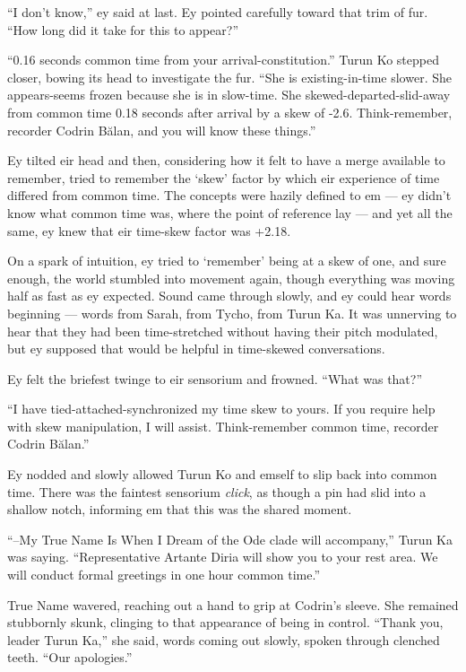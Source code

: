 ``I don't know,'' ey said at last. Ey pointed carefully toward that trim of fur. ``How long did it take for this to appear?''

``0.16 seconds common time from your arrival-constitution.'' Turun Ko stepped closer, bowing its head to investigate the fur. ``She is existing-in-time slower. She appears-seems frozen because she is in slow-time. She skewed-departed-slid-away from common time 0.18 seconds after arrival by a skew of -2.6. Think-remember, recorder Codrin Bălan, and you will know these things.''

Ey tilted eir head and then, considering how it felt to have a merge available to remember, tried to remember the `skew' factor by which eir experience of time differed from common time. The concepts were hazily defined to em — ey didn't know what common time was, where the point of reference lay — and yet all the same, ey knew that eir time-skew factor was +2.18.

On a spark of intuition, ey tried to `remember' being at a skew of one, and sure enough, the world stumbled into movement again, though everything was moving half as fast as ey expected. Sound came through slowly, and ey could hear words beginning — words from Sarah, from Tycho, from Turun Ka. It was unnerving to hear that they had been time-stretched without having their pitch modulated, but ey supposed that would be helpful in time-skewed conversations.

Ey felt the briefest twinge to eir sensorium and frowned. ``What was that?''

``I have tied-attached-synchronized my time skew to yours. If you require help with skew manipulation, I will assist. Think-remember common time, recorder Codrin Bălan.''

Ey nodded and slowly allowed Turun Ko and emself to slip back into common time. There was the faintest sensorium \emph{click}, as though a pin had slid into a shallow notch, informing em that this was the shared moment.

``--My True Name Is When I Dream of the Ode clade will accompany,'' Turun Ka was saying. ``Representative Artante Diria will show you to your rest area. We will conduct formal greetings in one hour common time.''

True Name wavered, reaching out a hand to grip at Codrin's sleeve. She remained stubbornly skunk, clinging to that appearance of being in control. ``Thank you, leader Turun Ka,'' she said, words coming out slowly, spoken through clenched teeth. ``Our apologies.''

